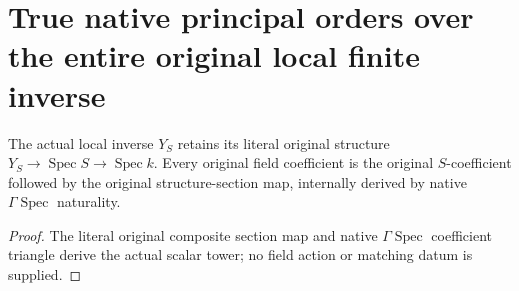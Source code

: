 \section{True native principal orders over the entire original local finite inverse}

\begin{definition}
\label{def:fc-local-finite-original-field-structure}
\leanok
{}
The actual local inverse $Y_S$ retains its literal original structure
$Y_S\to\operatorname{Spec}S\to\operatorname{Spec}k$.  Every original field
coefficient is the original $S$-coefficient followed by the original
structure-section map, internally derived by native
$\Gamma\operatorname{Spec}$ naturality.
\end{definition}
\begin{proof}
The literal original composite section map and native
$\Gamma\operatorname{Spec}$ coefficient triangle derive the actual scalar
tower; no field action or matching datum is supplied.
\end{proof}

